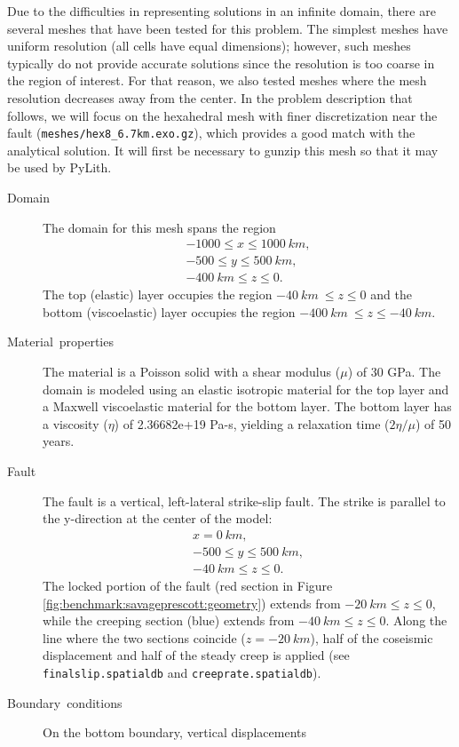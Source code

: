 Due to the difficulties in representing solutions in an infinite domain,
there are several meshes that have been tested for this problem. The
simplest meshes have uniform resolution (all cells have equal dimensions);
however, such meshes typically do not provide accurate solutions since
the resolution is too coarse in the region of interest. For that reason,
we also tested meshes where the mesh resolution decreases away from
the center. In the problem description that follows, we will focus
on the hexahedral mesh with finer discretization near the fault
({\tt meshes/hex8\_6.7km.exo.gz}), which provides a good match
with the analytical solution. It will first be necessary to gunzip
this mesh so that it may be used by PyLith.
\begin{description}
\item [Domain] The domain for this mesh spans the region
\begin{gather*}
-1000\leq x\leq1000\ km,\\
-500\leq y\leq500\ km,\\
-400\ km\leq z\leq0.
\end{gather*}
The top (elastic) layer occupies the region $-40\ km\ \leq z\leq0$
and the bottom (viscoelastic) layer occupies the region $-400\ km\ \leq z\leq-40\ km$.
\item [Material~properties] The material is a Poisson solid with a shear
modulus ($\mu$) of 30 GPa. The domain is modeled using an elastic
isotropic material for the top layer and a Maxwell viscoelastic material
for the bottom layer. The bottom layer has a viscosity ($\eta$) of
2.36682e+19 Pa-s, yielding a relaxation time ($2\eta/\mu$) of 50
years.
\item [Fault] The fault is a vertical, left-lateral strike-slip fault.
The strike is parallel to the y-direction at the center of the model:
\begin{gather*}
x=0\ km,\\
-500\leq y\leq500\ km,\\
-40\ km\leq z\leq0.
\end{gather*}
The locked portion of the fault (red section in Figure \vref{fig:benchmark:savageprescott:geometry})
extends from $-20\: km\leq z\leq0$, while the creeping section (blue)
extends from $-40\: km\leq z\leq0$. Along the line where the two
sections coincide ($z=-20\: km$), half of the coseismic displacement
and half of the steady creep is applied (see \texttt{finalslip.spatialdb}
and \texttt{creeprate.spatialdb}).
\item [Boundary~conditions] On the bottom boundary, vertical displacements

\end{description}
